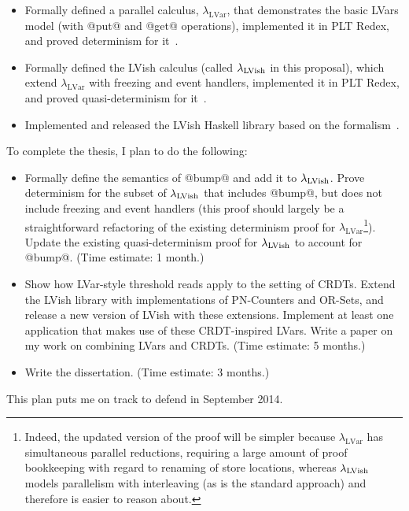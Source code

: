 \documentclass{article}
\begin{document}
\begin{itemize}
  \item Formally defined a parallel calculus,
    $\lambda_{\textrm{LVar}}$, that demonstrates the basic LVars model
    (with @put@ and @get@ operations), implemented it in PLT Redex,
    and proved determinism for it~\cite{LVars-paper, LVars-TR}.

  \item Formally defined the LVish calculus (called $\lambda_{\textrm{LVish}}$ in
    this proposal), which extend $\lambda_{\textrm{LVar}}$ with
    freezing and event handlers, implemented it in PLT Redex, and
    proved quasi-determinism for it~\cite{Freeze-paper, Freeze-TR}.

  \item Implemented and released the LVish Haskell library based on
    the formalism~\cite{Freeze-paper}.
\end{itemize}
To complete the thesis, I plan to do the following:
\begin{itemize}
\item Formally define the semantics of @bump@ and add it to
  $\lambda_{\textrm{LVish}}$.  Prove determinism for the subset of $\lambda_{\textrm{LVish}}$
  that includes @bump@, but does not include freezing and event
  handlers (this proof should largely be a straightforward refactoring
  of the existing determinism proof for
  $\lambda_{\textrm{LVar}}$\footnote{Indeed, the updated version of
    the proof will be simpler because $\lambda_{\textrm{LVar}}$ has
    simultaneous parallel reductions, requiring a large amount of
    proof bookkeeping with regard to renaming of store locations,
    whereas $\lambda_{\textrm{LVish}}$ models parallelism with interleaving (as is
    the standard approach) and therefore is easier to reason about.}).
  Update the existing quasi-determinism proof for $\lambda_{\textrm{LVish}}$ to
  account for @bump@.  (Time estimate: 1 month.)

\item Show how LVar-style threshold reads apply to the setting of
  CRDTs.  Extend the LVish library with implementations of PN-Counters
  and OR-Sets, and release a new version of LVish with these
  extensions. Implement at least one application that makes use of
  these CRDT-inspired LVars.  Write a paper on my work on combining
  LVars and CRDTs.  (Time estimate: 5 months.)

\item Write the dissertation. (Time estimate: 3 months.)
\end{itemize}
This plan puts me on track to defend in September 2014.



\end{document}
